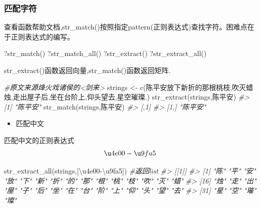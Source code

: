\documentclass[
]{book}
\newenvironment{Shaded}{\begin{snugshade}}{\end{snugshade}}
\newcommand{\CommentTok}[1]{\textcolor[rgb]{0.56,0.35,0.01}{\textit{#1}}}
\newcommand{\FunctionTok}[1]{\textcolor[rgb]{0.00,0.00,0.00}{#1}}
\newcommand{\NormalTok}[1]{#1}
\newcommand{\OtherTok}[1]{\textcolor[rgb]{0.56,0.35,0.01}{#1}}
\newcommand{\StringTok}[1]{\textcolor[rgb]{0.31,0.60,0.02}{#1}}
\providecommand{\tightlist}{%
  \setlength{\itemsep}{0pt}\setlength{\parskip}{0pt}}
\begin{document}
\hypertarget{ux5339ux914dux5b57ux7b26}{%
\subsubsection{匹配字符}\label{ux5339ux914dux5b57ux7b26}}

查看函数帮助文档,str\_match()按照指定pattern(正则表达式)查找字符。困难点在于正则表达式的编写。

\begin{Shaded}
\begin{Highlighting}[]
\NormalTok{?}\FunctionTok{str\_match}\NormalTok{()}
\NormalTok{?}\FunctionTok{str\_match\_all}\NormalTok{()}
\NormalTok{?}\FunctionTok{str\_extract}\NormalTok{()}
\NormalTok{?}\FunctionTok{str\_extract\_all}\NormalTok{()}
\end{Highlighting}
\end{Shaded}

str\_extract()函数返回向量,str\_match()函数返回矩阵.

\begin{Shaded}
\begin{Highlighting}[]
\CommentTok{\#原文来源烽火戏诸侯的\textless{}剑来\textgreater{}}
\NormalTok{strings }\OtherTok{\textless{}{-}} \FunctionTok{c}\NormalTok{(}\StringTok{\textquotesingle{}陈平安放下新折的那根桃枝,吹灭蜡烛,走出屋子后,坐在台阶上,仰头望去,星空璀璨.\textquotesingle{}}\NormalTok{) }
\FunctionTok{str\_extract}\NormalTok{(strings,}\StringTok{\textquotesingle{}陈平安\textquotesingle{}}\NormalTok{)}
\CommentTok{\#\textgreater{} [1] "陈平安"}
\FunctionTok{str\_match}\NormalTok{(strings,}\StringTok{\textquotesingle{}陈平安\textquotesingle{}}\NormalTok{)}
\CommentTok{\#\textgreater{}      [,1]    }
\CommentTok{\#\textgreater{} [1,] "陈平安"}
\end{Highlighting}
\end{Shaded}

\begin{itemize}
\tightlist
\item
  匹配中文
\end{itemize}

匹配中文的正则表达式\[\u4e00-\u9fa5\]

\begin{Shaded}
\begin{Highlighting}[]
\FunctionTok{str\_extract\_all}\NormalTok{(strings,}\StringTok{\textquotesingle{}[\textbackslash{}u4e00{-}\textbackslash{}u9fa5]\textquotesingle{}}\NormalTok{) }\CommentTok{\#返回list}
\CommentTok{\#\textgreater{} [[1]]}
\CommentTok{\#\textgreater{}  [1] "陈" "平" "安" "放" "下" "新" "折" "的" "那" "根" "桃" "枝" "吹" "灭" "蜡"}
\CommentTok{\#\textgreater{} [16] "烛" "走" "出" "屋" "子" "后" "坐" "在" "台" "阶" "上" "仰" "头" "望" "去"}
\CommentTok{\#\textgreater{} [31] "星" "空" "璀" "璨"}
\end{Highlighting}
\end{Shaded}
\end{document}

